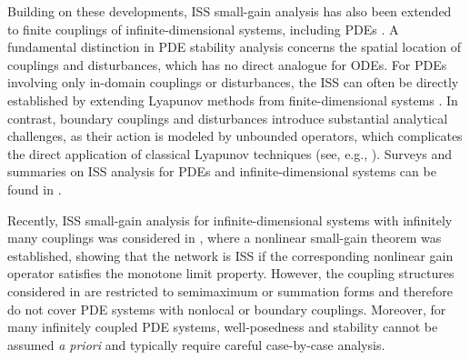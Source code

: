 \documentclass[onecolumn]{autart}
\numberwithin{equation}{section}
\begin{document}
   Building on these developments, ISS small-gain analysis has also been extended to finite couplings of infinite-dimensional systems, including PDEs \cite{DM,KK4,KK5,MI,Andri1}. A fundamental distinction in PDE stability analysis concerns the spatial location of couplings and disturbances, which has no direct analogue for ODEs. For PDEs involving only in-domain couplings or disturbances, the ISS can often be directly established by extending Lyapunov methods from finite-dimensional systems \cite{DM}. In contrast, boundary couplings and disturbances introduce substantial analytical challenges, as their action is modeled by unbounded operators, which complicates the direct application of classical Lyapunov techniques (see, e.g., \cite{JaNPS,KK1,KK2,LSZS,MKK,ZG3,ZG4}). Surveys and summaries on ISS analysis for PDEs and infinite-dimensional systems can be found in \cite{KK3,Andri,ZG2,ZG6}.


    Recently, ISS small-gain analysis for infinite-dimensional systems with infinitely many couplings was considered in \cite{MKG}, {where} a nonlinear small-gain theorem was established, showing that the network is ISS if the corresponding nonlinear gain operator satisfies the monotone limit property. However, the coupling structures considered in \cite{MKG} are restricted to semimaximum or summation forms and therefore do not cover PDE systems with nonlocal or boundary couplings. Moreover, for many infinitely coupled PDE systems, well-posedness and stability cannot be assumed {\textit{a priori}} and typically require careful case-by-case analysis.
\end{document}
